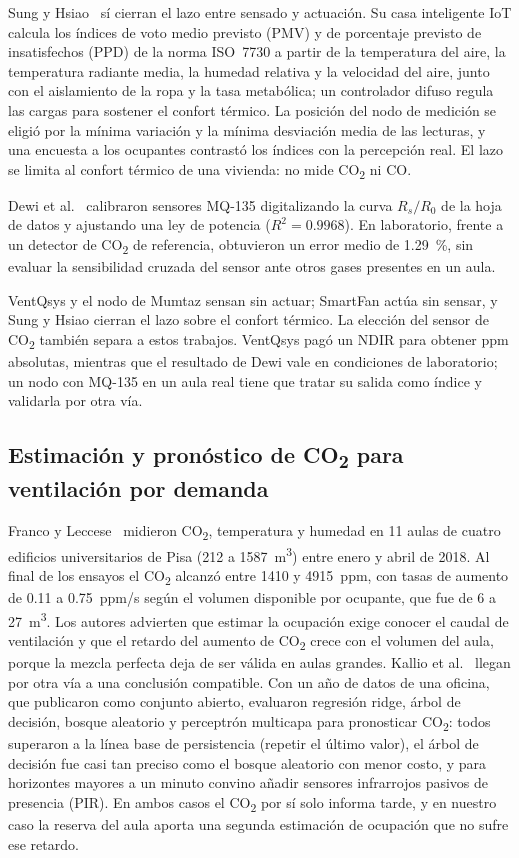 \documentclass[manuscript,screen,nonacm,natbib=false]{acmart}
\newcommand{\COdos}{CO\textsubscript{2}}
\begin{document}
Sung y Hsiao~\cite{sung2020thermal} sí cierran el lazo entre sensado y actuación. Su casa inteligente IoT calcula los índices de voto medio previsto (PMV) y de porcentaje previsto de insatisfechos (PPD) de la norma ISO~7730 a partir de la temperatura del aire, la temperatura radiante media, la humedad relativa y la velocidad del aire, junto con el aislamiento de la ropa y la tasa metabólica; un controlador difuso regula las cargas para sostener el confort térmico. La posición del nodo de medición se eligió por la mínima variación y la mínima desviación media de las lecturas, y una encuesta a los ocupantes contrastó los índices con la percepción real. El lazo se limita al confort térmico de una vivienda: no mide \COdos{} ni CO.

Dewi et al.~\cite{dewi2025mq135} calibraron sensores MQ-135 digitalizando la curva $R_s/R_0$ de la hoja de datos y ajustando una ley de potencia ($R^2 = 0.9968$). En laboratorio, frente a un detector de \COdos{} de referencia, obtuvieron un error medio de 1.29~\%, sin evaluar la sensibilidad cruzada del sensor ante otros gases presentes en un aula.

VentQsys y el nodo de Mumtaz sensan sin actuar; SmartFan actúa sin sensar, y Sung y Hsiao cierran el lazo sobre el confort térmico. La elección del sensor de \COdos{} también separa a estos trabajos. VentQsys pagó un NDIR para obtener ppm absolutas, mientras que el resultado de Dewi vale en condiciones de laboratorio; un nodo con MQ-135 en un aula real tiene que tratar su salida como índice y validarla por otra vía.

\subsection{Estimación y pronóstico de \texorpdfstring{\COdos{}}{CO2} para ventilación por demanda}
Franco y Leccese~\cite{franco2020co2} midieron \COdos{}, temperatura y humedad en 11 aulas de cuatro edificios universitarios de Pisa (212 a 1587~m\textsuperscript{3}) entre enero y abril de 2018. Al final de los ensayos el \COdos{} alcanzó entre 1410 y 4915~ppm, con tasas de aumento de 0.11 a 0.75~ppm/s según el volumen disponible por ocupante, que fue de 6 a 27~m\textsuperscript{3}. Los autores advierten que estimar la ocupación exige conocer el caudal de ventilación y que el retardo del aumento de \COdos{} crece con el volumen del aula, porque la mezcla perfecta deja de ser válida en aulas grandes. Kallio et al.~\cite{kallio2021forecasting} llegan por otra vía a una conclusión compatible. Con un año de datos de una oficina, que publicaron como conjunto abierto, evaluaron regresión ridge, árbol de decisión, bosque aleatorio y perceptrón multicapa para pronosticar \COdos{}: todos superaron a la línea base de persistencia (repetir el último valor), el árbol de decisión fue casi tan preciso como el bosque aleatorio con menor costo, y para horizontes mayores a un minuto convino añadir sensores infrarrojos pasivos de presencia (PIR). En ambos casos el \COdos{} por sí solo informa tarde, y en nuestro caso la reserva del aula aporta una segunda estimación de ocupación que no sufre ese retardo.
\end{document}
